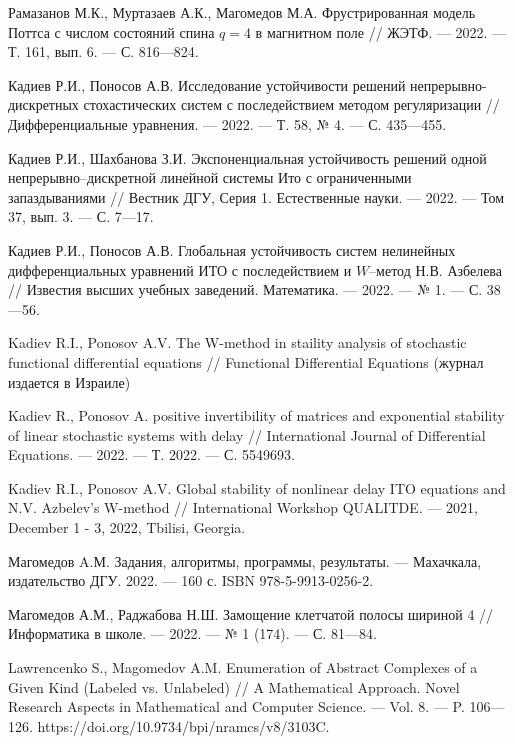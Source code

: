 \begin{thebibliography}{111}
Рамазанов М.К., Муртазаев А.К., Магомедов М.А.
Фрустрированная модель Поттса с числом состояний спина $q = 4$ в магнитном поле
//
ЖЭТФ.
--- 2022.
--- Т. 161, вып. 6.
--- С. 816---824.



Кадиев Р.И., Поносов А.В.
Исследование устойчивости решений непрерывно-дискретных стохастических систем с последействием методом регуляризации
//
Дифференциальные уравнения.
--- 2022.
--- Т. 58, № 4.
--- С. 435---455.

Кадиев Р.И., Шахбанова З.И.
Экспоненциальная устойчивость решений одной непрерывно--дискретной линейной системы Ито с ограниченными запаздываниями
//
Вестник ДГУ, Серия 1. Естественные науки.
--- 2022.
--- Том 37, вып. 3.
--- С. 7---17.

Кадиев Р.И., Поносов А.В. 
Глобальная устойчивость систем нелинейных дифференциальных уравнений ИТО с последействием и $W$--метод Н.В. Азбелева
//
Известия высших учебных заведений. Математика.
--- 2022.
--- № 1.
--- С. 38---56.

Kadiev R.I., Ponosov A.V.
The W-method in staility analysis of stochastic functional differential equations
//
Functional Differential Equations
(журнал издается в Израиле)

Kadiev R., Ponosov A. positive invertibility of matrices and
exponential stability of linear stochastic systems with delay
//
International Journal of Differential Equations.
--- 2022.
--- Т. 2022.
--- С. 5549693.

Kadiev R.I., Ponosov A.V.
Global stability of nonlinear delay ITO equations and N.V. Azbelev's W-method 
//
International Workshop QUALITDE.
--- 2021, December 1 - 3, 2022, Tbilisi, Georgia.



Магомедов A.М. 
Задания, алгоритмы, программы, результаты.
--- Махачкала, издательство ДГУ. 2022.
--- 160 с.
ISBN 978-5-9913-0256-2. 

Магомедов А.М., Раджабова Н.Ш. 
Замощение клетчатой полосы шириной 4
//
Информатика в школе.
--- 2022.
--- № 1 (174).
--- С. 81---84.

Lawrencenko S., Magomedov A.M. 
Enumeration of Abstract Complexes of a Given Kind (Labeled vs. Unlabeled)
//
A Mathematical Approach. Novel Research Aspects in Mathematical and Computer Science.
--- Vol. 8.
--- P. 106---126.
https://doi.org/10.9734/bpi/nramcs/v8/3103C.


\end{thebibliography}
